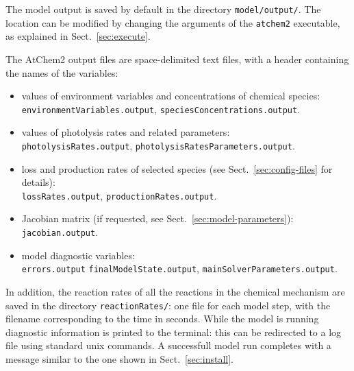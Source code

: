 The model output is saved by default in the directory
\texttt{model/output/}. The location can be modified by changing the
arguments of the \texttt{atchem2} executable, as explained in
Sect.~\ref{sec:execute}.

The AtChem2 output files are space-delimited text files, with a header
containing the names of the variables:

\begin{itemize}
\item values of environment variables and concentrations of chemical
  species:\\
  \texttt{environmentVariables.output},
  \texttt{speciesConcentrations.output}.
\item values of photolysis rates and related parameters:\\
  \texttt{photolysisRates.output},
  \texttt{photolysisRatesParameters.output}.
\item loss and production rates of selected species (see
  Sect.~\ref{sec:config-files} for details):\\
  \texttt{lossRates.output},
  \texttt{productionRates.output}.
\item Jacobian matrix (if requested, see Sect.~\ref{sec:model-parameters}):\\
  \texttt{jacobian.output}.
\item model diagnostic variables:\\
  \texttt{errors.output}
  \texttt{finalModelState.output},
  \texttt{mainSolverParameters.output}.
\end{itemize}

In addition, the reaction rates of all the reactions in the chemical
mechanism are saved in the directory \texttt{reactionRates/}: one file
for each model step, with the filename corresponding to the time in
seconds. While the model is running diagnostic information is printed
to the terminal: this can be redirected to a log file using standard
unix commands. A successfull model run completes with a message
similar to the one shown in Sect.~\ref{sec:install}.
